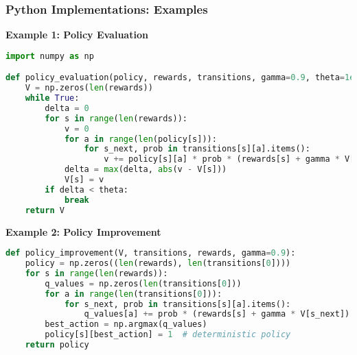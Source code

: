 \documentclass{beamer}
\begin{document}
\begin{frame}[fragile]
    \frametitle{Python Implementations: Examples}
    
    \textbf{Example 1: Policy Evaluation}
    \begin{lstlisting}[language=Python]
import numpy as np

def policy_evaluation(policy, rewards, transitions, gamma=0.9, theta=1e-10):
    V = np.zeros(len(rewards))
    while True:
        delta = 0
        for s in range(len(rewards)):
            v = 0
            for a in range(len(policy[s])):
                for s_next, prob in transitions[s][a].items():
                    v += policy[s][a] * prob * (rewards[s] + gamma * V[s_next])
            delta = max(delta, abs(v - V[s]))
            V[s] = v
        if delta < theta:
            break
    return V
    \end{lstlisting}
    
    \textbf{Example 2: Policy Improvement}
    \begin{lstlisting}[language=Python]
def policy_improvement(V, transitions, rewards, gamma=0.9):
    policy = np.zeros((len(rewards), len(transitions[0])))
    for s in range(len(rewards)):
        q_values = np.zeros(len(transitions[0]))
        for a in range(len(transitions[0])):
            for s_next, prob in transitions[s][a].items():
                q_values[a] += prob * (rewards[s] + gamma * V[s_next])
        best_action = np.argmax(q_values)
        policy[s][best_action] = 1  # deterministic policy
    return policy
    \end{lstlisting}
\end{frame}
\end{document}
